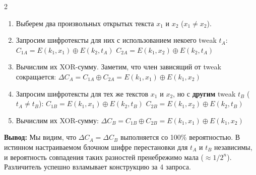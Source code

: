 ﻿\documentclass[10pt,a4paper,landscape]{extarticle}
\newcommand{\tightlist}{}
\begin{document}
\begin{multicols*}{2}
\begin{enumerate}
\def\labelenumi{\arabic{enumi}.}
\tightlist
\item
  Выберем два произвольных открытых текста \(x_1\) и \(x_2\) (\(x_1 \neq x_2\)).
\item
  Запросим шифротексты для них с использованием некоего tweak \(t_A\): \(C_{1A} = E(k_1, x_1) \oplus E(k_2, t_A)\) \(C_{2A} = E(k_1, x_2) \oplus E(k_2, t_A)\)
\item
  Вычислим их XOR-сумму. Заметим, что член зависящий от tweak сокращается: \(\Delta C_A = C_{1A} \oplus C_{2A} = E(k_1, x_1) \oplus E(k_1, x_2)\)
\item
  Запросим шифротексты для тех же текстов \(x_1\) и \(x_2\), но с \textbf{другим} tweak \(t_B\) (\(t_A \neq t_B\)): \(C_{1B} = E(k_1, x_1) \oplus E(k_2, t_B)\) \(C_{2B} = E(k_1, x_2) \oplus E(k_2, t_B)\)
\item
  Вычислим их XOR-сумму: \(\Delta C_B = C_{1B} \oplus C_{2B} = E(k_1, x_1) \oplus E(k_1, x_2)\)
\end{enumerate}

\textbf{Вывод:} Мы видим, что \(\Delta C_A = \Delta C_B\) выполняется со 100\% вероятностью. В истинном настраиваемом блочном шифре перестановки для \(t_A\) и \(t_B\) независимы, и вероятность совпадения таких разностей пренебрежимо мала (\(\approx 1/2^n\)). Различитель успешно взламывает конструкцию за 4 запроса.

\end{multicols*}
\end{document}
